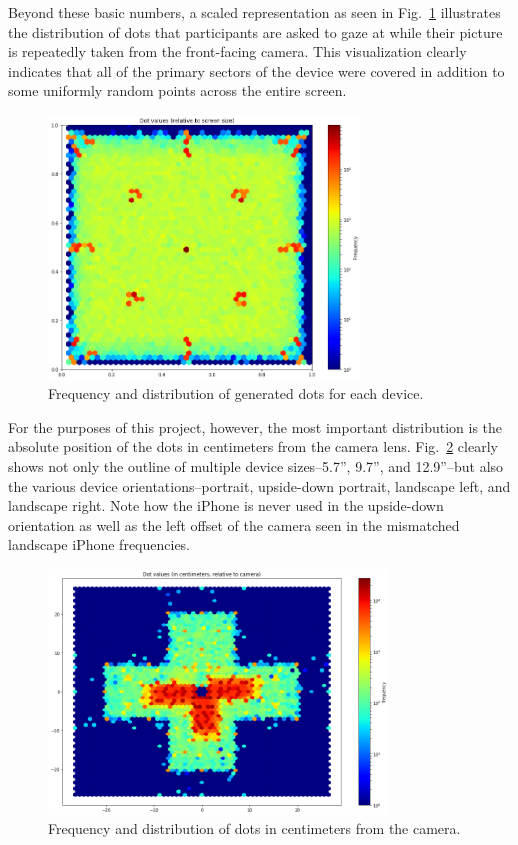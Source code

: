 \documentclass[aip, rsi, amsmath, amssymb, reprint, author-year, longbibliography]{revtex4-1}
\begin{document}
Beyond these basic numbers, a scaled representation as seen in
Fig.~\ref{fig:relativedots} illustrates the distribution of dots that
participants are asked to gaze at while their picture is repeatedly taken from
the front-facing camera. This visualization clearly indicates that all of the
primary sectors of the device were covered in addition to some uniformly random
points across the entire screen.

\begin{figure}[h]
  \includegraphics[height=7cm]{dot-values-relative.png}
  \caption{\label{fig:relativedots} Frequency and distribution of generated dots
    for each device.}
\end{figure}

For the purposes of this project, however, the most important distribution is
the absolute position of the dots in centimeters from the camera lens.
Fig.~\ref{fig:campoints} clearly shows not only the outline of multiple device
sizes--5.7'', 9.7'', and 12.9''--but also the various device
orientations--portrait, upside-down portrait, landscape left, and landscape
right. Note how the iPhone is never used in the upside-down orientation
as well as the left offset of the camera seen in the mismatched landscape iPhone
frequencies.

\begin{figure}
  \includegraphics[height=6.5cm]{cam-points-absolute.png}
\caption{\label{fig:campoints} Frequency and distribution of dots in centimeters
from the camera.}
\end{figure}
\end{document}

